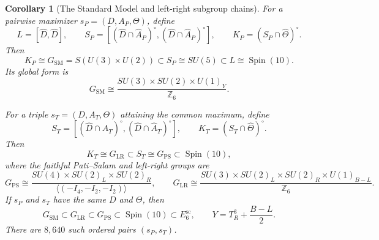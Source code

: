 \documentclass[11pt]{article}
\newtheorem{corollary}[theorem]{Corollary}
\theoremstyle{remark}
\newcommand{\Ksm}{G_{\mathrm{SM}}}
\newcommand{\Klr}{G_{\mathrm{LR}}}
\newcommand{\Kps}{G_{\mathrm{PS}}}
\begin{document}
\begin{corollary}[The Standard Model and left-right subgroup chains]
\label{cor:subgroup-chain}
For a pairwise maximizer \(s_P=(D,A_P,\Theta)\), define
\[
 L=[\widehat D,\widehat D],\qquad
 S_P=[(\widehat D\cap\widehat A_P)^\circ,
       (\widehat D\cap\widehat A_P)^\circ],\qquad
 K_P=(S_P\cap\widehat\Theta)^\circ.
\]
Then
\[
 K_P\cong \Ksm=S(U(3)\times U(2))
 \subset S_P\cong SU(5)
 \subset L\cong\operatorname{Spin}(10).
\]
Its global form is
\[
 \Ksm\cong
 \frac{SU(3)\times SU(2)\times U(1)_Y}{\mathbb Z_6}.
\]

For a triple \(s_T=(D,A_T,\Theta)\) attaining the common maximum, define
\[
 S_T=[(\widehat D\cap\widehat A_T)^\circ,
       (\widehat D\cap\widehat A_T)^\circ],\qquad
 K_T=(S_T\cap\widehat\Theta)^\circ.
\]
Then
\[
 K_T\cong\Klr
 \subset S_T\cong\Kps
 \subset\operatorname{Spin}(10),
\]
where the faithful Pati--Salam and left-right groups are
\[
 \Kps\cong
 \frac{SU(4)\times SU(2)_L\times SU(2)_R}
      {\langle(-I_4,-I_2,-I_2)\rangle},
 \qquad
 \Klr\cong
 \frac{SU(3)\times SU(2)_L\times SU(2)_R\times U(1)_{B-L}}
      {\mathbb Z_6}.
\]
If \(s_P\) and \(s_T\) have the same \(D\) and \(\Theta\), then
\[
 \Ksm\subset\Klr\subset\Kps
 \subset\operatorname{Spin}(10)\subset E_6^{\mathrm{sc}},
 \qquad Y=T_R^3+\frac{B-L}{2}.
\]
There are \(8{,}640\) such ordered pairs \((s_P,s_T)\).
\end{corollary}
\end{document}
